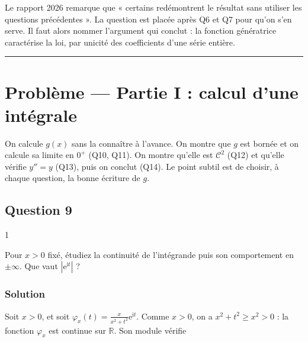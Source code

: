 \documentclass[11pt,a4paper]{article}
\begin{document}
\begin{jury}

Le rapport 2026 remarque que « certains redémontrent le résultat sans utiliser les questions précédentes ». La question est placée après Q6 et Q7 pour qu'on s'en serve. Il faut alors nommer l'argument qui conclut : la fonction génératrice caractérise la loi, par unicité des coefficients d'une série entière.

\end{jury}

\begin{center}\rule{0.5\linewidth}{0.5pt}\end{center}

\hypertarget{probluxe8me-partie-i-calcul-dune-intuxe9grale}{%
\section{Problème --- Partie I : calcul d'une intégrale}\label{probluxe8me-partie-i-calcul-dune-intuxe9grale}}

On calcule \(g(x)\) sans la connaître à l'avance. On montre que \(g\) est bornée et on calcule sa limite en \(0^+\) (Q10, Q11). On montre qu'elle est \({\mathcal{C}}^2\) (Q12) et qu'elle vérifie \(y''=y\) (Q13), puis on conclut (Q14). Le point subtil est de choisir, à chaque question, la bonne écriture de \(g\).

\hypertarget{question-9}{%
\subsection{Question 9}\label{question-9}}

\begin{indication}{1}

Pour \(x>0\) fixé, étudiez la continuité de l'intégrande puis son comportement en \(\pm\infty\). Que vaut \(|{\mathrm{e}}^{\mathrm{i}t}|\) ?

\end{indication}

\hypertarget{solution-8}{%
\subsubsection{Solution}\label{solution-8}}

Soit \(x>0\), et soit \(\varphi_x(t)=\frac{x}{x^2+t^2}{\mathrm{e}}^{\mathrm{i}t}\). Comme \(x>0\), on a \(x^2+t^2\ge x^2>0\) : la fonction \(\varphi_x\) est continue sur \(\mathbb{R}\). Son module vérifie
\end{document}
